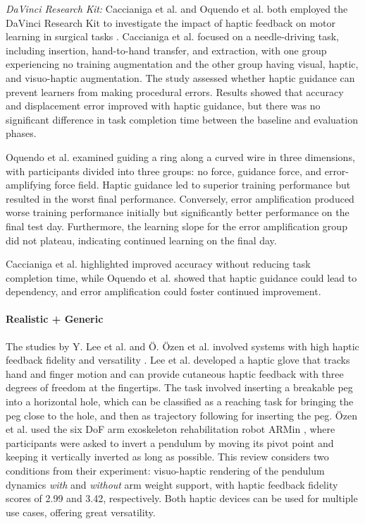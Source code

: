 \textit{DaVinci Research Kit:} Caccianiga et al. and Oquendo et al. both employed the DaVinci Research Kit to investigate the impact of haptic feedback on motor learning in surgical tasks \cite{Caccianiga2021, Oquendo2024}. Caccianiga et al. \cite{Caccianiga2021} focused on a needle-driving task, including insertion, hand-to-hand transfer, and extraction, with one group experiencing no training augmentation and the other group having visual, haptic, and visuo-haptic augmentation. The study assessed whether haptic guidance can prevent learners from making procedural errors. Results showed that accuracy and displacement error improved with haptic guidance, but there was no significant difference in task completion time between the baseline and evaluation phases.

Oquendo et al. \cite{Oquendo2024} examined guiding a ring along a curved wire in three dimensions, with participants divided into three groups: no force, guidance force, and error-amplifying force field. Haptic guidance led to superior training performance but resulted in the worst final performance. Conversely, error amplification produced worse training performance initially but significantly better performance on the final test day. Furthermore, the learning slope for the error amplification group did not plateau, indicating continued learning on the final day.

Caccianiga et al. \cite{Caccianiga2021} highlighted improved accuracy without reducing task completion time, while Oquendo et al. \cite{Oquendo2024} showed that haptic guidance could lead to dependency, and error amplification could foster continued improvement.


\paragraph{Realistic + Generic} \label{sec:realisticgeneric}
The studies by Y. Lee et al. and Ö. Özen et al. involved systems with high haptic feedback fidelity and versatility \cite{LeeY2019, Oezen2022}. Lee et al. developed a haptic glove that tracks hand and finger motion and can provide cutaneous haptic feedback with three degrees of freedom at the fingertips. The task involved inserting a breakable peg into a horizontal hole, which can be classified as a reaching task for bringing the peg close to the hole, and then as trajectory following for inserting the peg. Özen et al. used the six DoF arm exoskeleton rehabilitation robot ARMin \cite{Just2018ExoskeletonObserver}, where participants were asked to invert a pendulum by moving its pivot point and keeping it vertically inverted as long as possible. This review considers two conditions from their experiment: visuo-haptic rendering of the pendulum dynamics \textit{with} and \textit{without} arm weight support, with haptic feedback fidelity scores of 2.99 and 3.42, respectively. 
Both haptic devices can be used for multiple use cases, offering great versatility.

